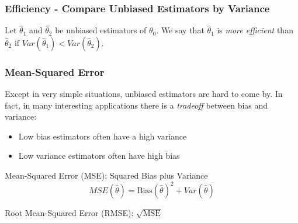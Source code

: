 \documentclass[handout]{beamer}
\begin{document}
\begin{frame}
\frametitle{Efficiency - Compare Unbiased Estimators by Variance}
Let $\widehat{\theta}_1$ and $\widehat{\theta}_2$ be unbiased estimators of $\theta_0$. We say that $\widehat{\theta}_1$ is \alert{\emph{more efficient}} than $\widehat{\theta}_2$ if $Var(\widehat{\theta}_1)<Var(\widehat{\theta}_2)$.
\end{frame}

\begin{frame}
\frametitle{Mean-Squared Error}
Except in very simple situations, unbiased estimators are hard to come by. In fact, in many interesting applications there is a \alert{\emph{tradeoff}} between \alert{bias} and \alert{variance}:
\begin{itemize}
\item Low bias estimators often have a high variance 
\item Low variance estimators often have high bias
\end{itemize}
\pause
\vspace{1em}
\alert{Mean-Squared Error (MSE):}   Squared Bias plus Variance
$$ MSE(\widehat{\theta}) = \mbox{Bias}(\widehat{\theta})^2 + Var(\widehat{\theta})$$ 

\alert{Root Mean-Squared Error (RMSE):} $\sqrt{\mbox{MSE}}$  

\end{frame}
\end{document}
